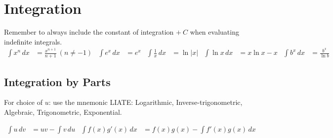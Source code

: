 \section{Integration}
Remember to always include the constant of integration \(+\ C\) when evaluating indefinite integrals.
\begin{align*}
    \int x^n \, dx      &= \frac{x^{n+1}}{n+1} \ (n \neq -1 )&
    \int e^x \, dx      &= e^x &
    \int \frac{1}{x} \, dx &= \ln |x| &
    \int \ln x \, dx    &= x \ln x - x &
    \int b^x \, dx      &= \frac{b^x}{\ln b}
\end{align*}


\subsection{Integration by Parts}
For choice of \( u \): use the mnemonic LIATE: Logarithmic, Inverse-trigonometric, Algebraic, Trigonometric, Exponential.

\begin{align*}
    \int u \, dv &= uv - \int v \, du & \int f(x) g'(x) \, dx &= f(x) g(x) - \int f'(x) g(x) \, dx
\end{align*}



